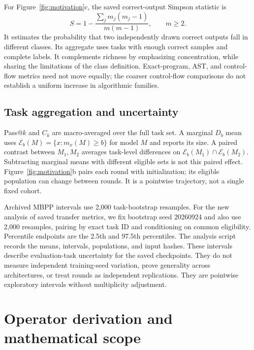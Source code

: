 \documentclass{article}
\begin{document}
For Figure~\ref{fig:motivation}c, the saved correct-output Simpson statistic is
\begin{equation}
\widehat S=1-\frac{\sum_j m_j(m_j-1)}{m(m-1)},\qquad m\ge2.
\end{equation}
It estimates the probability that two independently drawn correct outputs fall in different classes. Its aggregate uses tasks with enough correct samples and complete labels. It complements richness by emphasizing concentration, while sharing the limitations of the class definition. Exact-program, AST, and control-flow metrics need not move equally; the coarser control-flow comparisons do not establish a uniform increase in algorithmic families.

\subsection{Task aggregation and uncertainty}
Pass@$k$ and $C_k$ are macro-averaged over the full task set. A marginal $D_b$ mean uses $\mathcal E_b(M)=\{x:m_x(M)\ge b\}$ for model $M$ and reports its size. A paired contrast between $M_1,M_2$ averages task-level differences on $\mathcal E_b(M_1)\cap\mathcal E_b(M_2)$. Subtracting marginal means with different eligible sets is not this paired effect. Figure~\ref{fig:motivation}b pairs each round with initialization; its eligible population can change between rounds. It is a pointwise trajectory, not a single fixed cohort.

Archived MBPP intervals use 2,000 task-bootstrap resamples. For the new analysis of saved transfer metrics, we fix bootstrap seed 20260924 and also use 2,000 resamples, pairing by exact task ID and conditioning on common eligibility. Percentile endpoints are the 2.5th and 97.5th percentiles. The analysis script records the means, intervals, populations, and input hashes. These intervals describe evaluation-task uncertainty for the saved checkpoints. They do not measure independent training-seed variation, prove generality across architectures, or treat rounds as independent replications. They are pointwise exploratory intervals without multiplicity adjustment.

\FloatBarrier
\section{Operator derivation and mathematical scope}
\label{app:proofs}
\end{document}
